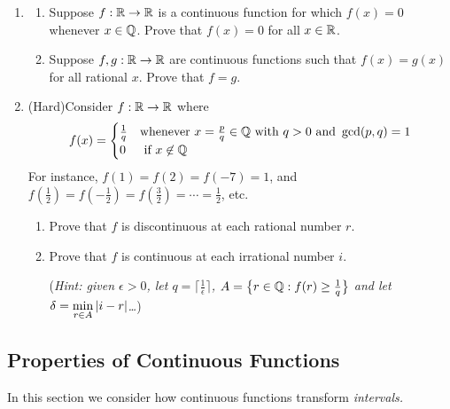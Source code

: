 \begin{exercises}{}{}
\begin{enumerate}
	
		\item%
		\begin{enumerate}
		  \item Suppose $f:\mathbb{R}\to\mathbb{R}$ is a continuous function for which $f(x)=0$ whenever $x\in\mathbb{Q}$. Prove that $f(x)=0$ for all $x\in\mathbb{R}$.
		  \item Suppose $f,g:\mathbb{R}\to\mathbb{R}$ are continuous functions such that $f(x)=g(x)$ for all rational $x$. Prove that $f=g$.  
		\end{enumerate}
	
		
		\item (Hard)\lstsp Consider $f:\mathbb{R}\to\mathbb{R}$ where
		\[
			f(x)=
			\begin{cases}
				\frac 1q&\text{whenever }x=\frac pq\in\mathbb{Q}\text{ with }q>0\text{ and }\gcd(p,q)=1\\
				0&\text{ if }x\not\in\mathbb{Q}
			\end{cases}
		\]
	  For instance, $f(1)=f(2)=f(-7)=1$, and $f(\tfrac 12)=f(-\tfrac 12)=f(\tfrac 32)=\cdots=\frac 12$, etc.
	  \begin{enumerate}
	    \item Prove that $f$ is discontinuous at each rational number $r$.
	    \item Prove that $f$ is continuous at each irrational number $i$.\par
	    (\emph{Hint: given $\epsilon>0$, let $q=\lceil\frac 1\epsilon\rceil$, $A=\bigl\{r\in\mathbb{Q}:f(r)\ge \frac 1q\bigr\}$ and let $\delta=\min\limits_{r\in A}\left| i-r\right|$\ldots})
	 	\end{enumerate}
	\end{enumerate}
\end{exercises}


\clearpage



\subsection{Properties of Continuous Functions}\label{sec:propcont}

In this section we consider how continuous functions transform \emph{intervals.}

